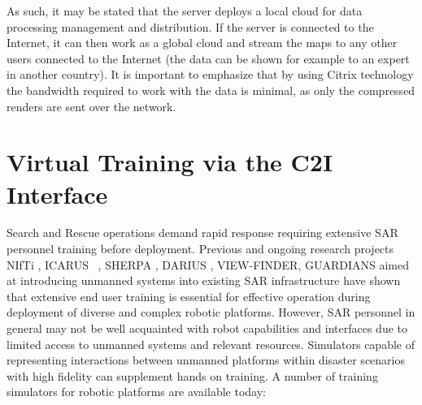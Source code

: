 \documentclass{article}
\begin{document}
As such, it may be stated that the server deploys a local cloud for data processing management and distribution.
If the server is connected to the Internet, it can then work as a global cloud and stream the maps to any other users connected to the Internet (the data can be shown for example to an expert in another country).
It is important to emphasize that by using Citrix technology the bandwidth required to work with the data is minimal, as only the compressed renders are sent over the network.

\afterpage{\clearpage}

\section{Virtual Training via the C2I Interface}\label{training}
Search and Rescue operations demand rapid response requiring extensive SAR personnel training before deployment.
Previous and ongoing research projects NIfTi \cite{NIFTI}, ICARUS ~\cite{ICARUS}, SHERPA \cite{sherpa}, DARIUS \cite{darius}, VIEW-FINDER\cite{viewfinder}, GUARDIANS\cite{guardians} aimed at introducing unmanned systems into existing SAR infrastructure have shown that extensive end user training is essential for effective operation during deployment of diverse and complex robotic platforms.
However, SAR personnel in general may not be well acquainted with robot capabilities and interfaces due to limited access to unmanned systems and relevant resources.
Simulators capable of representing interactions between unmanned platforms within disaster scenarios with high fidelity can supplement hands on training.
A number of training simulators for robotic platforms are available today:
\end{document}
